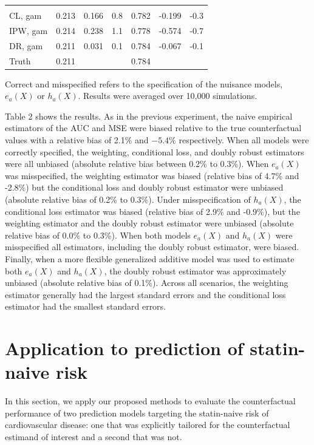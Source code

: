 \begin{table}[t]
\begin{threeparttable}
\begin{tabular}{lcccccc}
    \addlinespace[0.3em]
    \multicolumn{7}{l}{both misspecified}\\
    \hspace{1em}CL, gam & 0.213 & 0.166 & 0.8 & 0.782 & -0.199 & -0.3\\
    \hspace{1em}IPW, gam & 0.214 & 0.238 & 1.1 & 0.778 & -0.574 & -0.7\\
    \hspace{1em}DR, gam & 0.211 & 0.031 & 0.1 & 0.784 & -0.067 & -0.1\\
    Truth & 0.211 &  &  & 0.784 &  & \\
    \bottomrule
    \end{tabular}
    \begin{tablenotes}
    \item Correct and misspecified refers to the specification of the nuisance models, $e_a(X)$ or $h_a(X)$. Results were averaged over 10,000 simulations.
    \end{tablenotes}
    \end{threeparttable}
\end{table}

Table 2 shows the results. As in the previous experiment, the naive empirical estimators of the AUC and MSE were biased relative to the true counterfactual values with a relative bias of 2.1\% and $-5.4\%$ respectively. When all models were correctly specified, the weighting, conditional loss, and doubly robust estimators were all unbiased (absolute relative bias between 0.2\% to 0.3\%). When $e_a(X)$ was misspecified, the weighting estimator was biased (relative bias of 4.7\% and -2.8\%) but the conditional loss and doubly robust estimator were unbiased (absolute relative bias of 0.2\% to 0.3\%). Under misspecification of $h_a(X)$, the conditional loss estimator was biased (relative bias of 2.9\% and -0.9\%), but the weighting estimator and the doubly robust estimator were unbiased (absolute relative bias of 0.0\% to 0.3\%). When both models $e_a(X)$ and $h_a(X)$ were misspecified all estimators, including the doubly robust estimator, were biased. Finally, when a more flexible generalized additive model was used to estimate both $e_a(X)$ and $h_a(X)$, the doubly robust estimator was approximately unbiased (absolute relative bias of 0.1\%). Across all scenarios, the weighting estimator generally had the largest standard errors and the conditional loss estimator had the smallest standard errors.

\section{Application to prediction of statin-naive risk} \label{sec:results}
In this section, we apply our proposed methods to evaluate the counterfactual performance of two prediction models targeting the statin-naive risk of cardiovascular disease: one that was explicitly tailored for the counterfactual estimand of interest and a second that was not. 

